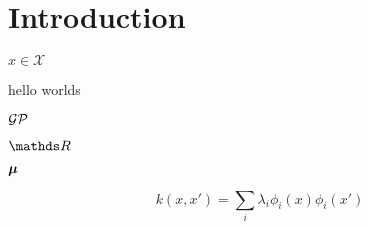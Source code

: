 \chapter{Introduction}  %


$x \in \mathcal{X}$

hello worlds \citep{neal1992bayesian}

$\mathcal{GP}$

$\Reals$

$\boldsymbol{\mu}$

\begin{equation}
k(x, x') = \sum_i \lambda_i \phi_i(x) \phi_i(x')
\end{equation}